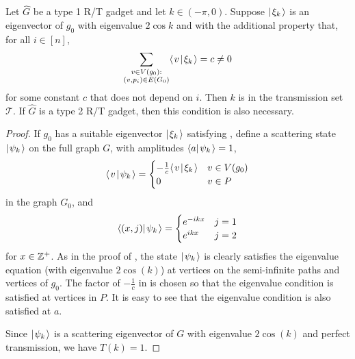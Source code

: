 \documentclass[../thesis-main/thesis-main]{subfiles}
\begin{document}
\begin{lemma}\label{lem:transmit_reqs}
Let $\widehat{G}$ be a type 1 R/T gadget and let $k\in (-\pi,0)$. Suppose $|\mspace{2mu} \xi_k \mspace{2mu} \rangle$ is an eigenvector of $g_0$ with eigenvalue $2\cos{k}$ and with the additional property that, for all $i \in [n]$,
\begin{equation}
\label{eq:trans_cond}
  \sum_{\substack{v \in V(g_0): \\ (v,p_i)\in E(G_0)}} \langle\mspace{2mu} v \mspace{2mu} | \mspace{2mu} \xi_k\mspace{2mu} \rangle = c \neq 0 
\end{equation}
for some constant $c$ that does not depend on $i$. Then $k$ is in the transmission set $\mathcal{T}$. If $\hat{G}$ is a type 2 R/T gadget, then this condition is also necessary.
\end{lemma}

\begin{proof}
If $g_0$ has a suitable eigenvector $|\mspace{2mu} \xi_k \mspace{2mu} \rangle$ satisfying , define a scattering state $|\mspace{2mu} \psi_k \mspace{2mu} \rangle$ on the full graph $G$, with amplitudes $\langle a|\mspace{2mu} \psi_k \mspace{2mu} \rangle=1$, 
\begin{equation}
  \langle\mspace{2mu} v \mspace{2mu} | \mspace{2mu} \psi_k\mspace{2mu} \rangle 
  = \begin{cases} -\frac{1}{c} \langle\mspace{2mu} v \mspace{2mu} | \mspace{2mu} \xi_k\mspace{2mu} \rangle & v\in V(g_0)\\
  	0 & v \in P
\end{cases}
\label{eq:psik_c}
\end{equation}
in the graph $G_0$, and 
\begin{equation}
 \langle{(x,j)} |\mspace{2mu} \psi_k \mspace{2mu} \rangle=\begin{cases} e^{-ikx} & j=1\\
 e^{ikx} & j=2
\end{cases}
\end{equation}
for $x \in \mathbb{Z}^+$.  As in the proof of , the state $|\mspace{2mu} \psi_k \mspace{2mu} \rangle$ is clearly satisfies the eigenvalue equation (with eigenvalue $2\cos(k)$) at vertices on the semi-infinite paths and vertices of $g_0$.  The factor of $-\frac{1}{c}$ in  is chosen so that the eigenvalue condition is satisfied at vertices in $P$.  It is easy to see that the eigenvalue condition is also satisfied at $a$.

Since $|\mspace{2mu} \psi_k \mspace{2mu} \rangle$ is a scattering eigenvector of $G$ with eigenvalue $2\cos(k)$ and perfect transmission, we have $T(k)=1$.


\end{proof}
\end{document}
